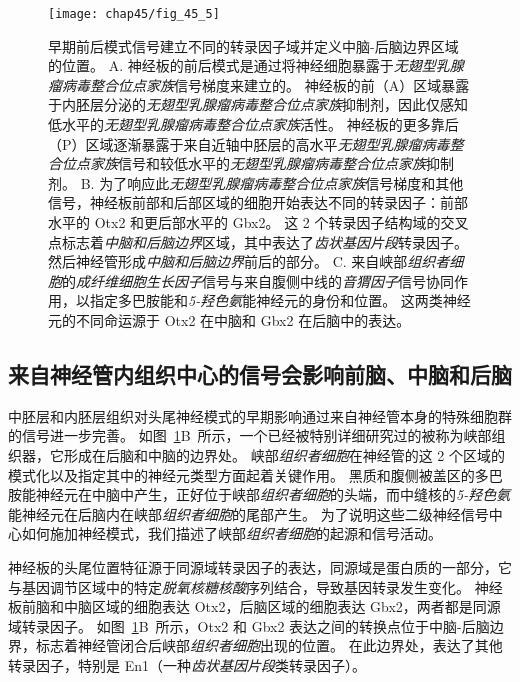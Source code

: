\begin{figure}[htbp]
	\centering
	\texttt{[image: chap45/fig\_45\_5]}
	\caption{早期前后模式信号建立不同的转录因子域并定义中脑-后脑边界区域的位置。
		A. 神经板的前后模式是通过将神经细胞暴露于\textit{无翅型乳腺瘤病毒整合位点家族}信号梯度来建立的。
		神经板的前（A）区域暴露于内胚层分泌的\textit{无翅型乳腺瘤病毒整合位点家族}抑制剂，因此仅感知低水平的\textit{无翅型乳腺瘤病毒整合位点家族}活性。
		神经板的更多靠后（P）区域逐渐暴露于来自近轴中胚层的高水平\textit{无翅型乳腺瘤病毒整合位点家族}信号和较低水平的\textit{无翅型乳腺瘤病毒整合位点家族}抑制剂。
		B. 为了响应此\textit{无翅型乳腺瘤病毒整合位点家族}信号梯度和其他信号，神经板前部和后部区域的细胞开始表达不同的转录因子：前部水平的 Otx2 和更后部水平的 Gbx2。
		这 2 个转录因子结构域的交叉点标志着\textit{中脑和后脑边界}区域，其中表达了\textit{齿状基因片段}转录因子。
		然后神经管形成\textit{中脑和后脑边界}前后的部分。
		C. 来自峡部\textit{组织者细胞}的\textit{成纤维细胞生长因子}信号与来自腹侧中线的\textit{音猬因子}信号协同作用，以指定多巴胺能和\textit{5-羟色氨}能神经元的身份和位置。
		这两类神经元的不同命运源于 Otx2 在中脑和 Gbx2 在后脑中的表达\cite{wurst2001neural}。}
	\label{fig:45_5}
\end{figure}



\subsection{来自神经管内组织中心的信号会影响前脑、中脑和后脑}

中胚层和内胚层组织对头尾神经模式的早期影响通过来自神经管本身的特殊细胞群的信号进一步完善。
如图~\ref{fig:45_5}B~所示，一个已经被特别详细研究过的被称为峡部组织器，它形成在后脑和中脑的边界处。
峡部\textit{组织者细胞}在神经管的这 2 个区域的模式化以及指定其中的神经元类型方面起着关键作用。
黑质和腹侧被盖区的多巴胺能神经元在中脑中产生，正好位于峡部\textit{组织者细胞}的头端，而中缝核的\textit{5-羟色氨}能神经元在后脑内在峡部\textit{组织者细胞}的尾部产生。
为了说明这些二级神经信号中心如何施加神经模式，我们描述了峡部\textit{组织者细胞}的起源和信号活动。


神经板的头尾位置特征源于同源域转录因子的表达，同源域是蛋白质的一部分，它与基因调节区域中的特定\textit{脱氧核糖核酸}序列结合，导致基因转录发生变化。
神经板前脑和中脑区域的细胞表达 Otx2，后脑区域的细胞表达 Gbx2，两者都是同源域转录因子。
如图~\ref{fig:45_5}B~所示，Otx2 和 Gbx2 表达之间的转换点位于中脑-后脑边界，标志着神经管闭合后峡部\textit{组织者细胞}出现的位置。
在此边界处，表达了其他转录因子，特别是 En1（一种\textit{齿状基因片段}类转录因子）。


